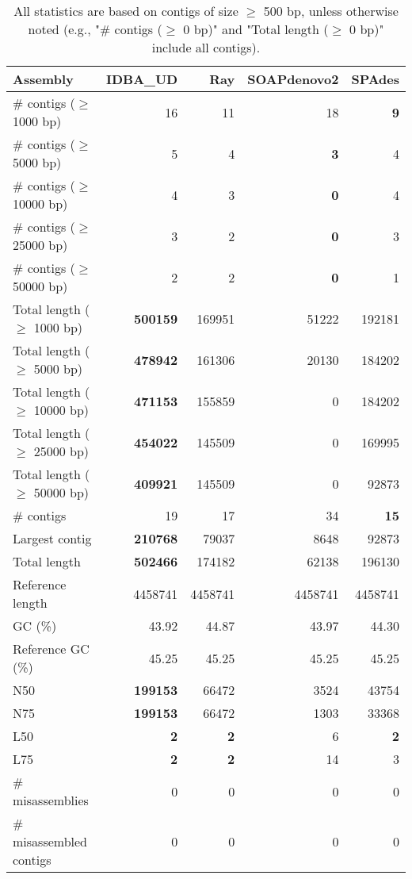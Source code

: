 \documentclass[12pt,a4paper]{article}
\begin{document}
\begin{table}[ht]
\begin{center}
\caption{All statistics are based on contigs of size $\geq$ 500 bp, unless otherwise noted (e.g., "\# contigs ($\geq$ 0 bp)" and "Total length ($\geq$ 0 bp)" include all contigs).}
\begin{tabular}{|l*{4}{|r}|}
\hline
Assembly & IDBA\_UD & Ray & SOAPdenovo2 & SPAdes \\ \hline
\# contigs ($\geq$ 1000 bp) & 16 & 11 & 18 & {\bf 9} \\ \hline
\# contigs ($\geq$ 5000 bp) & 5 & 4 & {\bf 3} & 4 \\ \hline
\# contigs ($\geq$ 10000 bp) & 4 & 3 & {\bf 0} & 4 \\ \hline
\# contigs ($\geq$ 25000 bp) & 3 & 2 & {\bf 0} & 3 \\ \hline
\# contigs ($\geq$ 50000 bp) & 2 & 2 & {\bf 0} & 1 \\ \hline
Total length ($\geq$ 1000 bp) & {\bf 500159} & 169951 & 51222 & 192181 \\ \hline
Total length ($\geq$ 5000 bp) & {\bf 478942} & 161306 & 20130 & 184202 \\ \hline
Total length ($\geq$ 10000 bp) & {\bf 471153} & 155859 & 0 & 184202 \\ \hline
Total length ($\geq$ 25000 bp) & {\bf 454022} & 145509 & 0 & 169995 \\ \hline
Total length ($\geq$ 50000 bp) & {\bf 409921} & 145509 & 0 & 92873 \\ \hline
\# contigs & 19 & 17 & 34 & {\bf 15} \\ \hline
Largest contig & {\bf 210768} & 79037 & 8648 & 92873 \\ \hline
Total length & {\bf 502466} & 174182 & 62138 & 196130 \\ \hline
Reference length & 4458741 & 4458741 & 4458741 & 4458741 \\ \hline
GC (\%) & 43.92 & 44.87 & 43.97 & 44.30 \\ \hline
Reference GC (\%) & 45.25 & 45.25 & 45.25 & 45.25 \\ \hline
N50 & {\bf 199153} & 66472 & 3524 & 43754 \\ \hline
N75 & {\bf 199153} & 66472 & 1303 & 33368 \\ \hline
L50 & {\bf 2} & {\bf 2} & 6 & {\bf 2} \\ \hline
L75 & {\bf 2} & {\bf 2} & 14 & 3 \\ \hline
\# misassemblies & 0 & 0 & 0 & 0 \\ \hline
\# misassembled contigs & 0 & 0 & 0 & 0 \\ \hline

\end{tabular}
\end{center}
\end{table}
\end{document}
